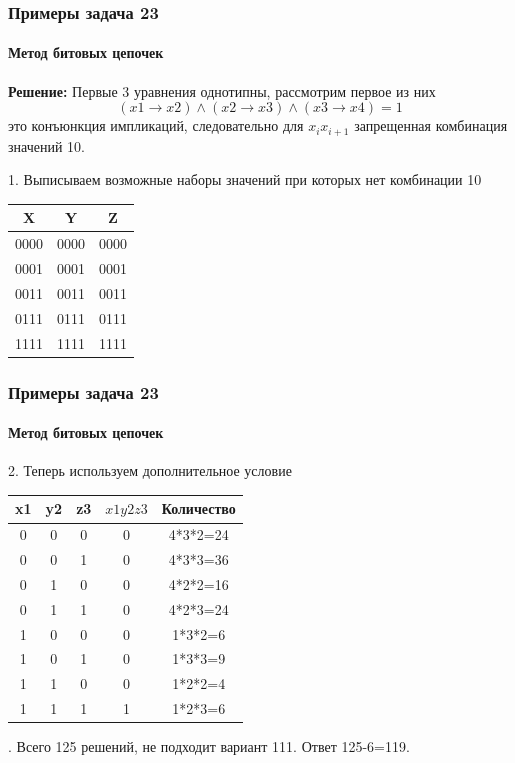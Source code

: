 \begin{frame}[t]
\frametitle{Примеры задача 23}
\framesubtitle{Метод битовых цепочек}

\textbf{Решение: }
Первые 3 уравнения однотипны, рассмотрим первое из них
$$
(x1 \rightarrow x2) \wedge (x2 \rightarrow x3) \wedge (x3 \rightarrow x4) = 1
$$
это конъюнкция импликаций, следовательно для $x_ix_{i+1}$ запрещенная комбинация значений 10.
	\pause 

1. Выписываем возможные наборы значений при которых нет комбинации 10

		\pause 
\begin{tabular}{ccc}
X & Y & Z\tabularnewline
\hline 
0000 & 0000 & 0000\tabularnewline
0001 & 0001 & 0001\tabularnewline
0011 & 0011 & 0011\tabularnewline
0111 & 0111 & 0111\tabularnewline
1111 & 1111 & 1111\tabularnewline
\end{tabular}

\end{frame}

\begin{frame}[t]
\frametitle{Примеры задача 23}
\framesubtitle{Метод битовых цепочек}

	
2. Теперь используем дополнительное условие
		\begin{tabular}{|c|c|c|c|c|}
\hline 
x1 & y2 & z3 & $x1y2z3$ & Количество\tabularnewline
\hline 
0 & 0 & 0 & 0 & 4{*}3{*}2=24\tabularnewline
\hline 
0 & 0 & 1 & 0 & 4{*}3{*}3=36\tabularnewline
\hline 
0 & 1 & 0 & 0 & 4{*}2{*}2=16\tabularnewline
\hline 
0 & 1 & 1 & 0 & 4{*}2{*}3=24\tabularnewline
\hline 
1 & 0 & 0 & 0 & 1{*}3{*}2=6\tabularnewline
\hline 
1 & 0 & 1 & 0 & 1{*}3{*}3=9\tabularnewline
\hline 
1 & 1 & 0 & 0 & 1{*}2{*}2=4\tabularnewline
\hline 
1 & 1 & 1 & 1 & 1{*}2{*}3=6\tabularnewline
\hline 
\end{tabular}

 	. Всего 125 решений, не подходит вариант 111. Ответ 125-6=119.

\end{frame}


